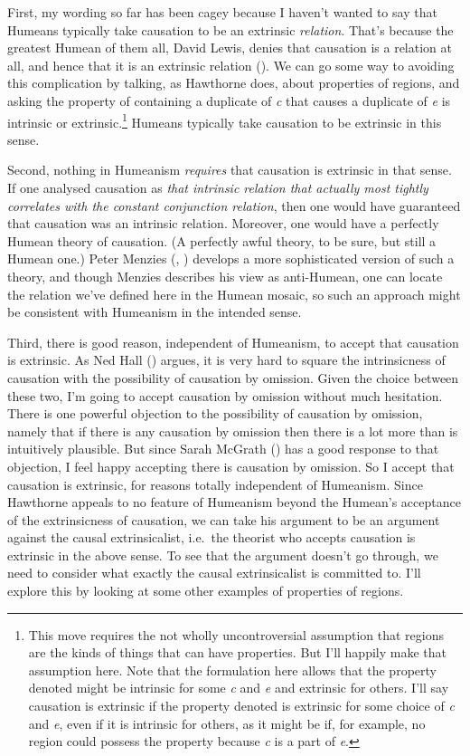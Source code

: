 \documentclass[
  11pt,
  letterpaper,
  DIV=11,
  numbers=noendperiod,
  twoside]{scrartcl}
\begin{document}
First, my wording so far has been cagey because I haven't wanted to say
that Humeans typically take causation to be an extrinsic
\emph{relation}. That's because the greatest Humean of them all, David
Lewis, denies that causation is a relation at all, and hence that it is
an extrinsic relation (). We can
go some way to avoiding this complication by talking, as Hawthorne does,
about properties of regions, and asking the property of containing a
duplicate of \emph{c} that causes a duplicate of \emph{e} is intrinsic
or extrinsic.\footnote{This move requires the not wholly uncontroversial
  assumption that regions are the kinds of things that can have
  properties. But I'll happily make that assumption here. Note that the
  formulation here allows that the property denoted might be intrinsic
  for some \emph{c} and \emph{e} and extrinsic for others. I'll say
  causation is extrinsic if the property denoted is extrinsic for some
  choice of \emph{c} and \emph{e}, even if it is intrinsic for others,
  as it might be if, for example, no region could possess the property
  because \emph{c} is a part of \emph{e}.} Humeans typically take
causation to be extrinsic in this sense.

Second, nothing in Humeanism \emph{requires} that causation is extrinsic
in that sense. If one analysed causation as \emph{that intrinsic
relation that actually most tightly correlates with the constant
conjunction relation}, then one would have guaranteed that causation was
an intrinsic relation. Moreover, one would have a perfectly Humean
theory of causation. (A perfectly awful theory, to be sure, but still a
Humean one.) Peter Menzies (,
) develops a more sophisticated version
of such a theory, and though Menzies describes his view as anti-Humean,
one can locate the relation we've defined here in the Humean mosaic, so
such an approach might be consistent with Humeanism in the intended
sense.

Third, there is good reason, independent of Humeanism, to accept that
causation is extrinsic. As Ned Hall ()
argues, it is very hard to square the intrinsicness of causation with
the possibility of causation by omission. Given the choice between these
two, I'm going to accept causation by omission without much hesitation.
There is one powerful objection to the possibility of causation by
omission, namely that if there is any causation by omission then there
is a lot more than is intuitively plausible. But since Sarah McGrath
() has a good response to that
objection, I feel happy accepting there is causation by omission. So I
accept that causation is extrinsic, for reasons totally independent of
Humeanism. Since Hawthorne appeals to no feature of Humeanism beyond the
Humean's acceptance of the extrinsicness of causation, we can take his
argument to be an argument against the causal extrinsicalist, i.e.~the
theorist who accepts causation is extrinsic in the above sense. To see
that the argument doesn't go through, we need to consider what exactly
the causal extrinsicalist is committed to. I'll explore this by looking
at some other examples of properties of regions.
\end{document}
